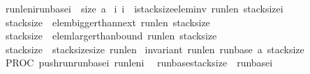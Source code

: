 \begin{isabellebody}
{\isacharparenleft}{\isasymacute}run{\isacharunderscore}len{\isacharunderscore}i{\isacharplus}{\isasymacute}run{\isacharunderscore}base{\isacharunderscore}i\ {\isasymle}\ size\ {\isasymacute}a{\isacharparenright}\ {\isasymand}\isanewline
{\isacharparenleft}{\isasymforall}i{\isachardot}\ {\isacharparenleft}{\isacharparenleft}i{\isasymge}{}\ {\isasymand}\ i{\isasymle}{\isasymacute}stack{\isacharunderscore}size{\isacharparenright}{\isasymlongrightarrow}{\isacharparenleft}elem{\isacharunderscore}inv\ {\isasymacute}run{\isacharunderscore}len\ {\isacharparenleft}{\isasymacute}stack{\isacharunderscore}size{\isacharminus}i{\isacharparenright}\ {}{}{\isacharparenright}{\isacharparenright}{\isacharparenright}\ {\isasymand}\isanewline
{\isacharparenleft}{\isasymacute}stack{\isacharunderscore}size{\isasymge}{}\ {\isasymlongrightarrow}\ elem{\isacharunderscore}bigger{\isacharunderscore}than{\isacharunderscore}next\ {\isasymacute}run{\isacharunderscore}len\ {\isacharparenleft}{\isasymacute}stack{\isacharunderscore}size{\isacharminus}{}{\isacharparenright}{\isacharparenright}\ {\isasymand}\isanewline
{\isacharparenleft}{\isasymacute}stack{\isacharunderscore}size{\isasymge}{}\ {\isasymlongrightarrow}\ elem{\isacharunderscore}larger{\isacharunderscore}than{\isacharunderscore}bound\ {\isasymacute}run{\isacharunderscore}len\ {\isacharparenleft}{\isasymacute}stack{\isacharunderscore}size{\isacharminus}{}{\isacharparenright}\ {}{}{\isacharparenright}\ {\isasymand}\isanewline
{\isacharparenleft}{\isasymacute}stack{\isacharunderscore}size{\isasymge}{}\ {\isasymand}\ {\isasymacute}stack{\isacharunderscore}size{\isasymle}{\isacharparenleft}size\ {\isasymacute}run{\isacharunderscore}len{\isacharparenright}{\isacharparenright}\ {\isasymand}\isanewline
{\isacharparenleft}invariant\ {\isasymacute}run{\isacharunderscore}len\ {\isasymacute}run{\isacharunderscore}base\ {\isasymacute}a\ {\isasymacute}stack{\isacharunderscore}size{\isacharparenright}\isanewline
\ {\isasymrbrace}\isanewline
PROC\ push{\isacharunderscore}run{\isacharparenleft}{\isasymacute}run{\isacharunderscore}base{\isacharunderscore}i{\isacharcomma}\ {\isasymacute}run{\isacharunderscore}len{\isacharunderscore}i{\isacharparenright}\ \isanewline
{\isasymlbrace}\ {\isacharparenleft}{\isasymacute}run{\isacharunderscore}base{\isacharbang}{\isacharparenleft}\isactrlbsup {\isasymsigma}\isactrlesup stack{\isacharunderscore}size{\isacharparenright}\ {\isacharequal}\ {\isasymacute}run{\isacharunderscore}base{\isacharunderscore}i{\isacharparenright}\ {\isasymand}\isanewline

\end{isabellebody}
